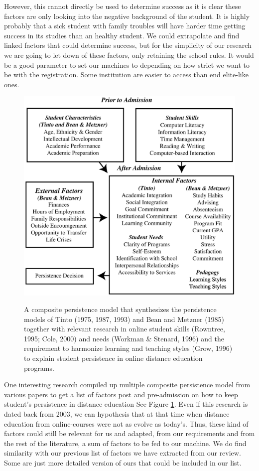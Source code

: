 \documentclass[../../main.tex]{subfiles}
\begin{document}
However, this cannot directly be used to determine success as it is clear these factors are only looking into the negative background of the student. It is highly probably that a sick student with family troubles will have harder time getting success in its studies than an healthy student. We could extrapolate and find linked factors that could determine success, but for the simplicity of our research we are going to let down of these factors, only retaining the school rules. It would be a good parameter to set our machines to depending on how strict we want to be with the registration. Some institution are easier to access than end elite-like ones.


\begin{figure}
    \centering
    \includegraphics[width=1\linewidth]{res//diagram/composite-persistence-mdl.png}
    \caption{A composite persistence model that synthesizes the persistence models of Tinto (1975, 1987, 1993) and Bean and Metzner (1985) together with relevant research in online student skills (Rowntree, 1995; Cole, 2000) and needs (Workman \& Stenard, 1996) and the requirement to harmonize learning and teaching styles (Grow, 1996) to explain student persistence in online distance education programs. \cite{rovai_search_2003}}\cite{tinto_dropout_1975,bean_conceptual_1985,rowntree_teaching_1995}
    \label{fig:persistence-mdl}
\end{figure}
One interesting research compiled up multiple composite persistence model from various papers to get a list of factors post and pre-admission on how to keep student's persistence in distance education\cite{rovai_search_2003} See Figure \ref{fig:persistence-mdl}. Even if this research is dated back from 2003, we can hypothesis that at that time when distance education from online-courses were not as evolve as today's. Thus, these kind of factors could still be relevant for us and adapted, from our requirements and from the rest of the literature, a sum of factors to be fed to our machine.
We do find similarity with our previous list of factors we have extracted from our review. Some are just more detailed version of ours that could be included in our list.
\end{document}

